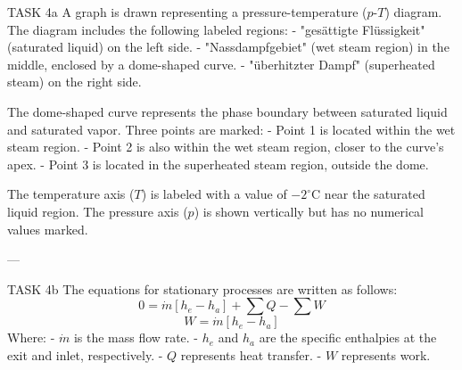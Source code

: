 TASK 4a  
A graph is drawn representing a pressure-temperature (\(p\)-\(T\)) diagram. The diagram includes the following labeled regions:  
- "gesättigte Flüssigkeit" (saturated liquid) on the left side.  
- "Nassdampfgebiet" (wet steam region) in the middle, enclosed by a dome-shaped curve.  
- "überhitzter Dampf" (superheated steam) on the right side.  

The dome-shaped curve represents the phase boundary between saturated liquid and saturated vapor. Three points are marked:  
- Point 1 is located within the wet steam region.  
- Point 2 is also within the wet steam region, closer to the curve's apex.  
- Point 3 is located in the superheated steam region, outside the dome.  

The temperature axis (\(T\)) is labeled with a value of \(-2^\circ\text{C}\) near the saturated liquid region. The pressure axis (\(p\)) is shown vertically but has no numerical values marked.

---

TASK 4b  
The equations for stationary processes are written as follows:  
\[
0 = \dot{m} \left[ h_e - h_a \right] + \sum Q - \sum W
\]
\[
W = \dot{m} \left[ h_e - h_a \right]
\]  
Where:  
- \( \dot{m} \) is the mass flow rate.  
- \( h_e \) and \( h_a \) are the specific enthalpies at the exit and inlet, respectively.  
- \( Q \) represents heat transfer.  
- \( W \) represents work.